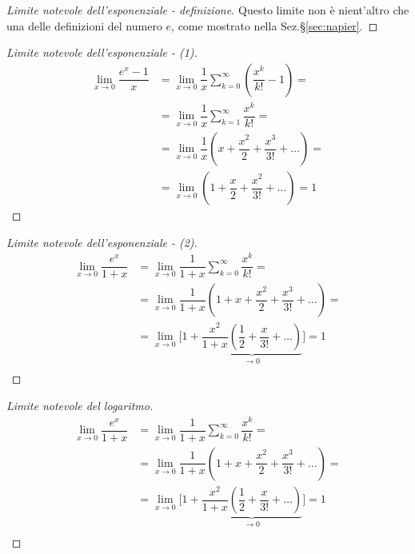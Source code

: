 \begin{proof}[Limite notevole dell'esponenziale - definizione] Questo limite non è nient'altro che una delle definizioni del numero $e$, come mostrato nella Sez.\S\ref{sec:napier}.
\end{proof}
\begin{proof}[Limite notevole dell'esponenziale - (1)]
    \begin{equation}
        \begin{aligned}
            \lim_{x \rightarrow 0} \dfrac{e^x - 1}{x} 
            & = \lim_{x \rightarrow 0} \dfrac{1}{x}\sum_{k=0}^{\infty} \left( \dfrac{x^k}{k!} - 1 \right) = \\
            & = \lim_{x \rightarrow 0} \dfrac{1}{x}\sum_{k=1}^{\infty} \dfrac{x^k}{k!} = \\
            & = \lim_{x \rightarrow 0} \dfrac{1}{x} \left( x + \dfrac{x^2}{2} + \dfrac{x^3}{3!} + \dots  \right) = \\
            & = \lim_{x \rightarrow 0} \left( 1 + \dfrac{x}{2} + \dfrac{x^2}{3!} + \dots  \right) = 1 
        \end{aligned}
    \end{equation}
\end{proof}
\begin{proof}[Limite notevole dell'esponenziale - (2)]
    \begin{equation}
        \begin{aligned}
            \lim_{x \rightarrow 0} \dfrac{e^x}{1+x} 
            & = \lim_{x \rightarrow 0} \dfrac{1}{1+x}\sum_{k=0}^{\infty} \dfrac{x^k}{k!} = \\
            & = \lim_{x \rightarrow 0} \dfrac{1}{1+x}\left( 1 + x + \dfrac{x^2}{2} + \dfrac{x^3}{3!} + \dots \right) = \\
            & = \lim_{x \rightarrow 0} \bigg[ 1 + \underbrace{\dfrac{x^2}{1+x} \left( \dfrac{1}{2} + \dfrac{x}{3!} + \dots \right)}_{\rightarrow 0} \bigg] = 1 \\
        \end{aligned}
    \end{equation}
\end{proof}
\begin{proof}[Limite notevole del logaritmo]
    \begin{equation}
        \begin{aligned}
            \lim_{x \rightarrow 0} \dfrac{e^x}{1+x} 
            & = \lim_{x \rightarrow 0} \dfrac{1}{1+x}\sum_{k=0}^{\infty} \dfrac{x^k}{k!} = \\
            & = \lim_{x \rightarrow 0} \dfrac{1}{1+x}\left( 1 + x + \dfrac{x^2}{2} + \dfrac{x^3}{3!} + \dots \right) = \\
            & = \lim_{x \rightarrow 0} \bigg[ 1 + \underbrace{\dfrac{x^2}{1+x} \left( \dfrac{1}{2} + \dfrac{x}{3!} + \dots \right)}_{\rightarrow 0} \bigg] = 1 \\
        \end{aligned}
    \end{equation}
\end{proof}

